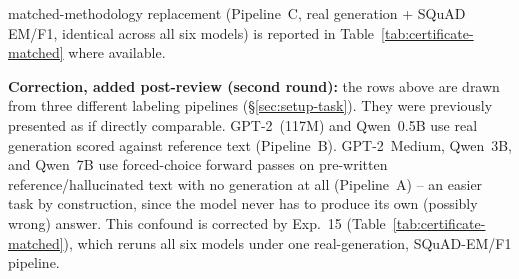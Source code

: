 \documentclass[onecolumn]{jmlr}
\begin{document}
\begin{table}[!htbp]
{  matched-methodology replacement (Pipeline~C, real generation + SQuAD
  EM/F1, identical across all six models) is reported in
  Table~\ref{tab:certificate-matched} where available.}
\label{tab:certificate}
\small
\setlength{\tabcolsep}{3pt}
\end{table}

\textbf{Correction, added post-review (second round):} the rows above
are drawn from three different labeling pipelines
(\S\ref{sec:setup-task}). They were previously presented as if directly
comparable. GPT-2~(117M) and Qwen~0.5B use real generation scored
against reference text (Pipeline~B). GPT-2~Medium, Qwen~3B, and
Qwen~7B use forced-choice forward passes on pre-written
reference/hallucinated text with no generation at all (Pipeline~A) --
an easier task by construction, since the model never has to produce
its own (possibly wrong) answer. This confound is corrected by Exp.~15
(Table~\ref{tab:certificate-matched}), which reruns all six models
under one real-generation, SQuAD-EM/F1 pipeline.
\end{document}
